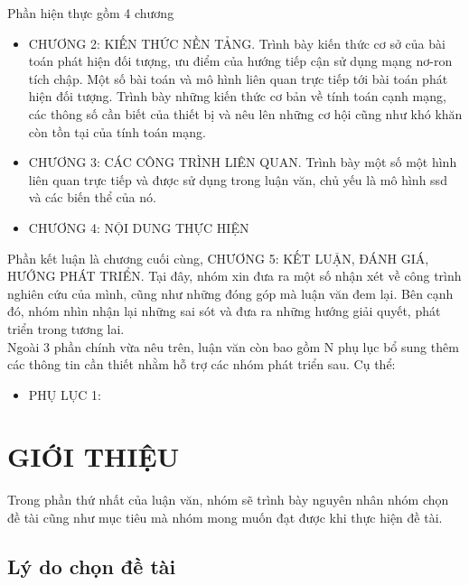 \documentclass[a4paper]{report}
\begin{document}
Phần hiện thực gồm 4 chương\\
\begin{itemize}
	\item CHƯƠNG 2: KIẾN THỨC NỀN TẢNG. Trình bày kiến thức cơ sở của bài toán phát hiện
	 đối tượng, ưu điểm của hướng tiếp cận sử dụng mạng nơ-ron tích chập. Một số bài 
	 toán và mô hình liên quan trực tiếp tới bài toán phát hiện đối tượng. Trình bày 
	 những kiến thức cơ bản về tính toán cạnh mạng, các thông số cần biết của thiết bị
	  và nêu lên những cơ hội cũng như khó khăn còn tồn tại của tính toán mạng. 
	\item CHƯƠNG 3: CÁC CÔNG TRÌNH LIÊN QUAN. Trình bày một số một hình liên quan 
	trực tiếp và được sử dụng trong luận văn, chủ yếu là mô hình ssd và các biến thể 
	của nó.

	\item CHƯƠNG 4: NỘI DUNG THỰC HIỆN
\end{itemize}

Phần kết luận là chương cuối cùng, CHƯƠNG 5: KẾT LUẬN, ĐÁNH GIÁ, HƯỚNG PHÁT TRIỂN. Tại đây, nhóm xin đưa
ra một số nhận xét về công trình nghiên cứu của mình, cũng như những đóng góp mà luận
văn đem lại. Bên cạnh đó, nhóm nhìn nhận lại những sai sót và đưa ra những hướng giải
quyết, phát triển trong tương lai.\\

Ngoài 3 phần chính vừa nêu trên, luận văn còn bao gồm N phụ lục bổ sung thêm các
thông tin cần thiết nhằm hỗ trợ các nhóm phát triển sau. Cụ thể:
\begin{itemize}
	\item PHỤ LỤC 1:
\end{itemize}

\newpage %
\listoftables
\newpage
\listoffigures


\newpage
\tableofcontents
\newpage



\chapter{GIỚI THIỆU} 
Trong phần thứ nhất của luận văn, nhóm sẽ 
trình bày nguyên nhân nhóm chọn đề tài cũng như mục tiêu mà nhóm mong muốn đạt được 
khi thực hiện đề tài.

\section{Lý do chọn đề tài}
\end{document}

